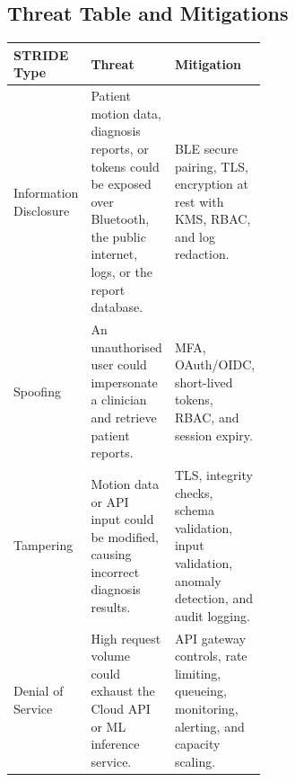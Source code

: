 \documentclass[11pt,a4paper]{article}
\begin{document}
\subsection{Threat Table and Mitigations}
\begin{table}[H]
\centering
\begin{tabularx}{\linewidth}{>{\raggedright\arraybackslash}p{0.20\linewidth} >{\raggedright\arraybackslash}X >{\raggedright\arraybackslash}p{0.36\linewidth}}
\toprule
\textbf{STRIDE Type} & \textbf{Threat} & \textbf{Mitigation}\\
\midrule
Information Disclosure & Patient motion data, diagnosis reports, or tokens could be exposed over Bluetooth, the public internet, logs, or the report database. & BLE secure pairing, TLS, encryption at rest with KMS, RBAC, and log redaction.\\
Spoofing & An unauthorised user could impersonate a clinician and retrieve patient reports. & MFA, OAuth/OIDC, short-lived tokens, RBAC, and session expiry.\\
Tampering & Motion data or API input could be modified, causing incorrect diagnosis results. & TLS, integrity checks, schema validation, input validation, anomaly detection, and audit logging.\\
Denial of Service & High request volume could exhaust the Cloud API or ML inference service. & API gateway controls, rate limiting, queueing, monitoring, alerting, and capacity scaling.\\
\bottomrule
\end{tabularx}
\end{table}
\end{document}
